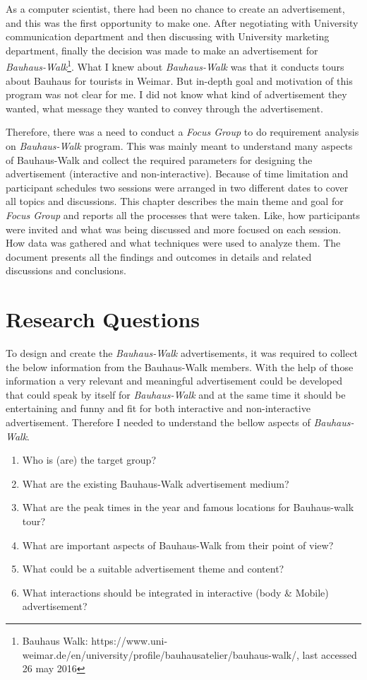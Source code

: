 As a computer scientist, there had been no chance to create an advertisement, and this was the first opportunity to make one. After negotiating with University communication department and then discussing with University marketing department, finally the decision was made to make an advertisement for \emph{Bauhaus-Walk}\footnote{Bauhaus Walk: https://www.uni-weimar.de/en/university/profile/bauhausatelier/bauhaus-walk/, last accessed 26 may 2016}. What I knew about \emph{Bauhaus-Walk} was that it conducts tours about Bauhaus for tourists in Weimar. But in-depth goal and motivation of this program was not clear for me. I did not know what kind of advertisement they wanted, what message they wanted to convey through the advertisement.
   
Therefore, there was a need to conduct a \emph{Focus Group} to do requirement analysis on \emph{Bauhaus-Walk} program. This was mainly meant to understand many aspects of Bauhaus-Walk and collect the required parameters for designing the advertisement (interactive and non-interactive). Because of time limitation and participant schedules two sessions were arranged in two different dates to cover all topics and discussions. This chapter describes the main theme and goal for \emph{Focus Group} and reports all the processes that were taken. Like, how participants were invited and what was being discussed and more focused on each session. How data was gathered and what techniques were used to analyze them. The document presents all the findings and outcomes in details and related discussions and conclusions.

\section{Research Questions}
To design and create the \emph{Bauhaus-Walk} advertisements, it was required to collect the below information from the Bauhaus-Walk members. With the help of those information a very relevant and meaningful advertisement could be developed that could speak by itself for \emph{Bauhaus-Walk} and at the same time it should be entertaining and funny and fit for both interactive and non-interactive advertisement. Therefore I needed to understand the bellow aspects of \emph{Bauhaus-Walk}.

\begin{enumerate}
\item Who is (are) the target group?
\item What are the existing Bauhaus-Walk advertisement medium?
\item What are the peak times in the year and famous locations for Bauhaus-walk tour?
\item What are important aspects of Bauhaus-Walk from their point of view?
\item What could be a suitable advertisement theme and content?
\item What interactions should be integrated in interactive (body \& Mobile) advertisement?
\end{enumerate}



